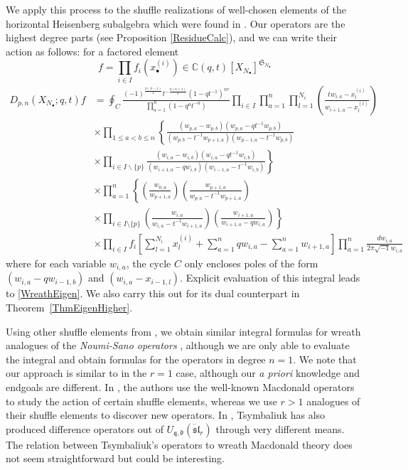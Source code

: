 \documentclass{amsart}
\newcommand{\C}{\mathbb{C}}
\newcommand{\qqq}{\mathfrak{q}}
\newcommand{\ddd}{\mathfrak{d}}
\newcommand{\Sym}{\mathfrak{S}}
\theoremstyle{remark}
\numberwithin{thm}{section}
\numberwithin{equation}{section}
\begin{document}
We apply this process to the shuffle realizations of well-chosen elements of the horizontal Heisenberg subalgebra which were found in \cite{Wen}.
Our operators are the highest degree parts (see Proposition \ref{ResidueCalc}), and we can write their action as follows: for a factored element
\[
f=\prod_{i\in I} f_i\left(x^{(i)}_{\bullet}\right)\in\C(q,t)\left[ X_{N_\bullet} \right]^{\Sym_{N_\bullet}}
\]
\begin{align*}
D_{p,n}(X_{N_\bullet};q,t)f&= \oint_{C}
\frac{(-1)^{\frac{n(n-1)}{2}}t^{-\frac{n(n+1)}{2}}(1-qt^{-1})^{nr}}{\prod_{a=1}^n(1-q^at^{-a})} 
\prod_{i\in I}\prod_{a=1}^n\prod_{l=1}^{N_i}\left(\frac{  tw_{i,a}-x^{(i)}_{l} }{ w_{i+1,a}-x^{(i)}_{l} }\right)\\
&\times\prod_{1\le a<b\le n}\left\{
\frac{\left(w_{p,a}-w_{p,b}\right)\left(w_{p,a}-qt^{-1}w_{p,b}\right)}{\left(w_{p,b}-t^{-1}w_{p+1,a}\right)\left(w_{p-1,a}-t^{-1}w_{p,b}\right)}\right.\\
&\times\left.
\prod_{i\in I\backslash\{p\}}
\frac{\left(w_{i,a}-w_{i,b}\right)\left(w_{i,a}-qt^{-1}w_{i,b}\right)}{\left(w_{i+1,a}-qw_{i,b}\right)\left(w_{i-1,a}-t^{-1}w_{i,b}\right)}\right\}\\
&\times
\prod_{a=1}^n\left\{
\left(\frac{w_{0,a}}{w_{p+1,a}}\right)\left(\frac{w_{p+1,a}}{w_{p,a}-t^{-1}w_{p+1,a}}\right)\right.\\
&\times\left.
\prod_{i\in I\setminus\{p\}}
\left(\frac{w_{i,a}}{w_{i,a}-t^{-1}w_{i+1,a}}\right)
\left( \frac{w_{i+1,a}}{w_{i+1,a}-qw_{i,a}} \right)
\right\}\\ 
&\times 
\prod_{i\in I}f_i\left[  \sum_{l=1}^{N_i}x^{(i)}_{l}+\sum_{a=1}^nqw_{i,a}-\sum_{a=1}^nw_{i+1,a} \right]
\prod_{a=1}^n \frac{dw_{i,a}}{2\pi\sqrt{-1}w_{i,a}}
\end{align*}
where for each variable $w_{i,a}$, the cycle $C$ only encloses poles of the form $(w_{i,a}-qw_{i-1,b})$ and $(w_{i,a}-x_{i-1,l})$.
Explicit evaluation of this integral leads to \eqref{WreathEigen}.
We also carry this out for its dual counterpart in Theorem~\ref{ThmEigenHigher}.

Using other shuffle elements from \cite{Wen}, we obtain similar integral formulas for wreath analogues of the \textit{Noumi-Sano operators} \cite{NSa}, although we are only able to evaluate the integral and obtain formulas for the operators in degree $n=1$.
We note that our approach is similar to \cite{FHHSY} in the $r=1$ case, although our \textit{a priori} knowledge and endgoals are different.
In \cite{FHHSY}, the authors use the well-known Macdonald operators to study the action of certain shuffle elements, whereas we use $r>1$ analogues of their shuffle elements to discover new operators.
In \cite{T2}, Tsymbaliuk has also produced difference operators out of $U_{\qqq,\ddd}(\ddot{\mathfrak{sl}}_r)$ through very different means.
The relation between Tsymbaliuk's operators to wreath Macdonald theory does not seem straightforward but could be interesting.
\end{document}

